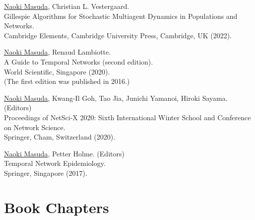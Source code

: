 \documentclass[11pt,letter]{article}
\begin{document}
\begin{etaremune}


\item \underline{Naoki Masuda}, Christian L. Vestergaard.\\
Gillespie Algorithms for Stochastic Multiagent Dynamics in Populations and Networks.\\
Cambridge Elements, Cambridge University Press, Cambridge, UK (2022).


\item \underline{Naoki Masuda}, Renaud Lambiotte.\\
A Guide to Temporal Networks (second edition).\\
World Scientific, Singapore (2020).\\
(The first edition was published in 2016.)

\item \underline{Naoki Masuda}, Kwang-Il Goh, Tao Jia, Junichi Yamanoi, Hiroki Sayama. (Editors)\\
Proceedings of NetSci-X 2020: Sixth International Winter School and Conference on Network Science.\\
Springer, Cham, Switzerland (2020).

\item \underline{Naoki Masuda}, Petter Holme. (Editors)\\
Temporal Network Epidemiology.\\
Springer, Singapore (2017).


\end{etaremune}

\section*{\bf \normalsize Book Chapters}
\end{document}
